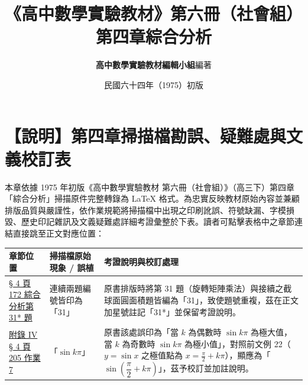 \documentclass[a4paper,12pt,twoside]{article}
\title{\LARGE\textbf{《高中數學實驗教材》第六冊（社會組）}\\[0.5em] \Large\textbf{第四章\quad 綜合分析}}
\author{\textbf{高中數學實驗教材編輯小組}\quad 編著}
\date{民國六十四年（1975）初版}
\begin{document}
\maketitle
\thispagestyle{firstpage}

\section*{【說明】第四章掃描檔勘誤、疑難處與文義校訂表}
\label{sec:errata_notes_b6_ch4}
\label{sec:current_errata}

本章依據 1975 年初版《高中數學實驗教材 第六冊（社會組）》（高三下）第四章「綜合分析」掃描原件完整轉錄為 \LaTeX{} 格式。為忠實反映教材原始內容並兼顧排版品質與嚴謹性，依作業規範將掃描檔中出現之印刷訛誤、符號缺漏、字模損毀、歷史印記雜訊及文義疑難處詳細考證彙整於下表。讀者可點擊表格中之章節連結直接跳至正文對應位置：

\begin{table}[H]
\centering
\small
\renewcommand{\arraystretch}{1.35}
\begin{tabularx}{\textwidth}{|p{3.2cm}|p{3.8cm}|X|}
\hline
\textbf{章節位置} & \textbf{掃描檔原始現象 / 誤植} & \textbf{考證說明與校訂處理} \\ \hline

\hyperref[note:b6s-ch4-p172-prob-dup]{§ 4 頁 172 綜合分析第 31* 題} & 
連續兩題編號皆印為「31」 & 
原書排版時將第 31 題（旋轉矩陣乘法）與接續之截球面圓面積題皆編為「31」，致使題號重複，茲在正文加星號註記「31*」並保留考證說明。 \\ \hline

\hyperref[note:b6s-app4-p205-sin]{附錄 IV § 4 頁 205 作業 7} & 
「$\sin k\pi$」 & 
原書該處誤印為「當 $k$ 為偶數時 $\sin k\pi$ 為極大值，當 $k$ 為奇數時 $\sin k\pi$ 為極小值」，對照前文例 22（$y=\sin x$ 之極值點為 $x=\frac{\pi}{2}+k\pi$），顯應為「$\sin\left(\dfrac{\pi}{2}+k\pi\right)$」，茲予校訂並加註說明。 \\ \hline

\end{tabularx}
\end{table}

\newpage
\renewcommand{\contentsname}{目\qquad 次}
\tableofcontents
\newpage

\setcounter{section}{3}

\end{document}
